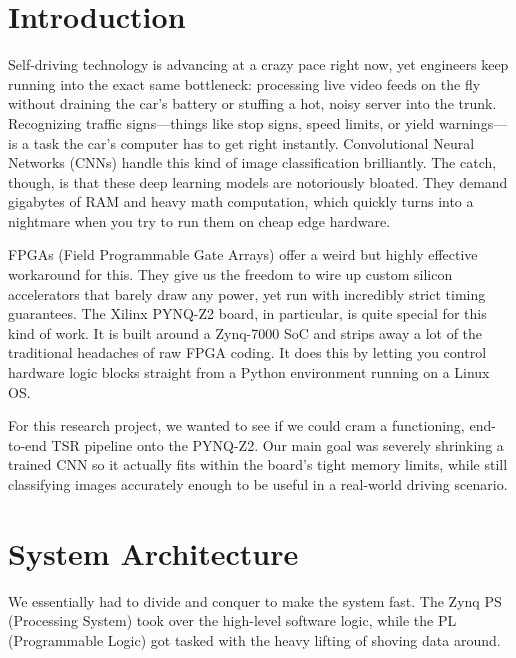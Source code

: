 \documentclass[conference]{IEEEtran}
\begin{document}
\section{Introduction}
Self-driving technology is advancing at a crazy pace right now, yet engineers keep running into the exact same bottleneck: processing live video feeds on the fly without draining the car's battery or stuffing a hot, noisy server into the trunk. Recognizing traffic signs---things like stop signs, speed limits, or yield warnings---is a task the car's computer has to get right instantly. Convolutional Neural Networks (CNNs) handle this kind of image classification brilliantly. The catch, though, is that these deep learning models are notoriously bloated. They demand gigabytes of RAM and heavy math computation, which quickly turns into a nightmare when you try to run them on cheap edge hardware.

FPGAs (Field Programmable Gate Arrays) offer a weird but highly effective workaround for this. They give us the freedom to wire up custom silicon accelerators that barely draw any power, yet run with incredibly strict timing guarantees. The Xilinx PYNQ-Z2 board, in particular, is quite special for this kind of work. It is built around a Zynq-7000 SoC and strips away a lot of the traditional headaches of raw FPGA coding. It does this by letting you control hardware logic blocks straight from a Python environment running on a Linux OS.

For this research project, we wanted to see if we could cram a functioning, end-to-end TSR pipeline onto the PYNQ-Z2. Our main goal was severely shrinking a trained CNN so it actually fits within the board's tight memory limits, while still classifying images accurately enough to be useful in a real-world driving scenario.

\section{System Architecture}
We essentially had to divide and conquer to make the system fast. The Zynq PS (Processing System) took over the high-level software logic, while the PL (Programmable Logic) got tasked with the heavy lifting of shoving data around.
\end{document}
